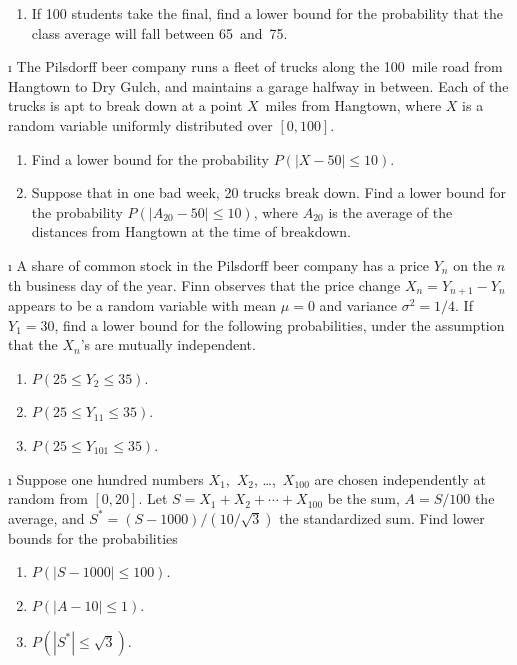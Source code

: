 {\begin{LJSItem}
\begin{enumerate}
\item If 100 students take the final, find a lower bound for the probability
that the class average will fall between 65~and~75.
\end{enumerate}

\i\label{exer 8.2.107} The Pilsdorff beer company runs a fleet of trucks along the 100~mile
road from Hangtown to Dry Gulch, and maintains a garage halfway in between. 
Each of the trucks is apt to break down at a point $X$~miles from Hangtown,
where $X$ is a random variable uniformly distributed over $[0,100]$.
\begin{enumerate}
\item Find a lower bound for the probability $P(|X - 50| \leq 10)$.

\item Suppose that in one bad week, 20 trucks break down.  Find a lower bound
for the probability $P(|A_{20} - 50| \leq 10)$, where $A_{20}$ is the average
of the distances from Hangtown at the time of breakdown.
\end{enumerate}

\i\label{exer 8.2.12} A share of common stock in the Pilsdorff beer company
has a price $Y_n$ on the $n$th business day of the year.  Finn observes that the
price change $X_n = Y_{n + 1} - Y_n$ appears to be a random variable with mean
$\mu = 0$ and variance $\sigma^2 =1/4$.  If $Y_1 = 30$, find a lower bound for
the following probabilities, under the assumption that the $X_n$'s are mutually independent.
\begin{enumerate}
\item $P(25 \leq Y_2 \leq 35)$.

\item $P(25 \leq Y_{11} \leq 35)$.

\item $P(25 \leq Y_{101} \leq 35)$.
\end{enumerate}

\i\label{exer 8.2.108} Suppose one hundred numbers $X_1$,~$X_2$, \dots,~$X_{100}$ are chosen
independently at random from $[0,20]$.  Let $S = X_1 + X_2 +\cdots+ X_{100}$
be the sum, $A = S/100$ the average, and $S^* = (S - 1000)/(10/\sqrt3)$ the
standardized sum.  Find lower bounds for the probabilities
\begin{enumerate}
\item $P(|S - 1000| \leq 100)$.

\item $P(|A - 10| \leq 1)$.

\item $P(|S^*| \leq \sqrt3)$.
\end{enumerate}


\end{LJSItem}}
